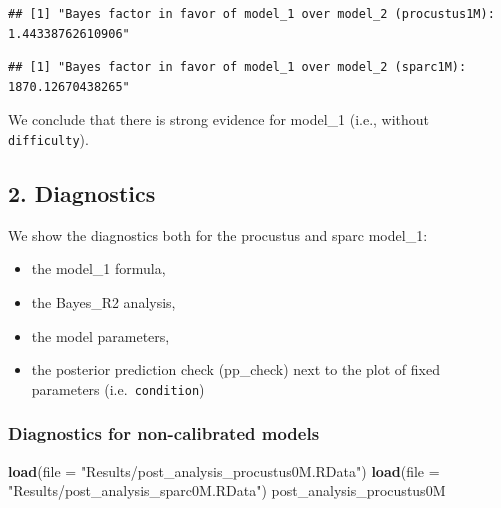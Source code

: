 \documentclass[
]{article}
\newenvironment{Shaded}{\begin{snugshade}}{\end{snugshade}}
\newcommand{\AttributeTok}[1]{\textcolor[rgb]{0.13,0.29,0.53}{#1}}
\newcommand{\FunctionTok}[1]{\textcolor[rgb]{0.13,0.29,0.53}{\textbf{#1}}}
\newcommand{\NormalTok}[1]{#1}
\newcommand{\SpecialCharTok}[1]{\textcolor[rgb]{0.81,0.36,0.00}{\textbf{#1}}}
\newcommand{\StringTok}[1]{\textcolor[rgb]{0.31,0.60,0.02}{#1}}
\begin{document}
\begin{verbatim}
## [1] "Bayes factor in favor of model_1 over model_2 (procustus1M):  1.44338762610906"
\end{verbatim}

\begin{Shaded}
\end{Shaded}

\begin{verbatim}
## [1] "Bayes factor in favor of model_1 over model_2 (sparc1M):  1870.12670438265"
\end{verbatim}

We conclude that there is strong evidence for model\_1 (i.e., without
\texttt{difficulty}).

\hypertarget{diagnostics}{%
\subsection{2. Diagnostics}\label{diagnostics}}

We show the diagnostics both for the procustus and sparc model\_1:

\begin{itemize}
\item
  the model\_1 formula,
\item
  the Bayes\_R2 analysis,
\item
  the model parameters,
\item
  the posterior prediction check (pp\_check) next to the plot of fixed
  parameters (i.e.~\texttt{condition})
\end{itemize}

\hypertarget{diagnostics-for-non-calibrated-models}{%
\subsubsection{Diagnostics for non-calibrated
models}\label{diagnostics-for-non-calibrated-models}}

\begin{Shaded}
\begin{Highlighting}[]
\FunctionTok{load}\NormalTok{(}\AttributeTok{file =} \StringTok{"Results/post\_analysis\_procustus0M.RData"}\NormalTok{)}
\FunctionTok{load}\NormalTok{(}\AttributeTok{file =} \StringTok{"Results/post\_analysis\_sparc0M.RData"}\NormalTok{)}
\NormalTok{post\_analysis\_procustus0M}
\end{Highlighting}
\end{Shaded}
\end{document}
